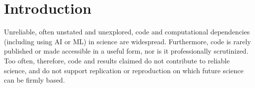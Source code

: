 \documentclass{comjnl}
\begin{document}
%


\section{Introduction}
Unreliable, often unstated and unexplored, code and computational dependencies (including using AI or ML) in science are widespread. Furthermore, code is rarely published or made accessible in a useful form, nor is it professionally scrutinized. Too often, therefore, code and results claimed do not contribute to reliable science, and do not support replication or reproduction on which future science can be firmly based.   
\end{document}
